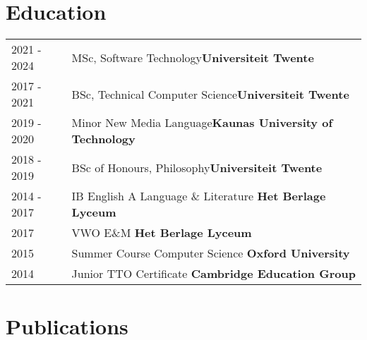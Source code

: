 \documentclass[a4paper,12pt]{article}
\begin{document}
\section{Education}
\begin{tabularx}{\linewidth}{@{}l X@{}}	
2021 - 2024 & MSc, Software Technology\hfill \textbf{Universiteit Twente} \\

2017 - 2021 & BSc, Technical Computer Science\hfill \textbf{Universiteit Twente} \\ 

2019 - 2020 & Minor New Media Language\hfill \textbf{Kaunas University of Technology} \\

2018 - 2019 & BSc of Honours, Philosophy\hfill \textbf{Universiteit Twente} \\

2014 - 2017 & IB English A Language \& Literature \hfill \textbf{Het Berlage Lyceum} \\

2017 & VWO E\&M \hfill \textbf{Het Berlage Lyceum} \\

2015 & Summer Course Computer Science \hfill \textbf{Oxford University} \\

2014 & Junior TTO Certificate \hfill \textbf{Cambridge Education Group} \\
\end{tabularx}

\section{Publications}
\begin{refsection}
\printbibliography[heading=none]
\nocite{*}
\end{refsection}

\end{document}
